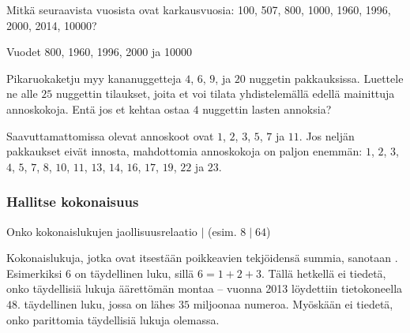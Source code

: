 \begin{tehtavasivu}
\begin{tehtava}
Mitkä seuraavista vuosista ovat karkausvuosia: 100, 507, 800, 1000, 1960, 1996, 2000, 2014, 10000?
	\begin{vastaus}
	Vuodet 800, 1960, 1996, 2000 ja 10000
	\end{vastaus}
\end{tehtava}

\begin{tehtava}
Pikaruokaketju myy kananuggetteja $4$, $6$, $9$, ja $20$ nuggetin pakkauksissa. Luettele ne alle $25$ nuggettin tilaukset, joita et voi tilata yhdistelemällä edellä mainittuja annoskokoja. Entä jos et kehtaa ostaa $4$ nuggettin lasten annoksia?
	\begin{vastaus}
		Saavuttamattomissa olevat annoskoot ovat $1$, $2$, $3$, $5$, $7$ ja $11$. Jos neljän pakkaukset eivät innosta, mahdottomia annoskokoja on paljon enemmän: $1$, $2$, $3$, $4$, $5$, $7$, $8$, $10$, $11$, $13$, $14$, $16$, $17$, $19$, $22$ ja $23$.
	\end{vastaus}
\end{tehtava}

\subsubsection*{Hallitse kokonaisuus}

\begin{tehtava}
Onko kokonaislukujen jaollisuusrelaatio $\mid$ (esim. $8\mid 64$)
	\begin{vastaus}
	\end{vastaus}
\end{tehtava}

\begin{tehtava}
Kokonaislukuja, jotka ovat itsestään poikkeavien tekjöidensä summia, sanotaan . Esimerkiksi $6$ on täydellinen luku, sillä $6=1+2+3$. Tällä hetkellä ei tiedetä, onko täydellisiä lukuja äärettömän montaa -- vuonna 2013 löydettiin tietokoneella $48.$ täydellinen luku, jossa on lähes $35$ miljoonaa numeroa. Myöskään ei tiedetä, onko parittomia täydellisiä lukuja olemassa.
	\begin{vastaus}
	\end{vastaus}
\end{tehtava}


\end{tehtavasivu}
